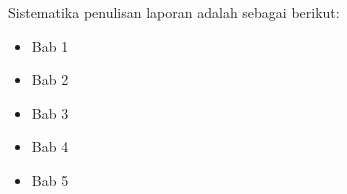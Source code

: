 
Sistematika penulisan laporan adalah sebagai berikut:
\begin{itemize}
	\item Bab 1 \babSatu \\
	\item Bab 2 \babDua \\
	\item Bab 3 \babTiga \\
	\item Bab 4 \babEmpat \\
	\item Bab 5 \kesimpulan \\
\end{itemize}


